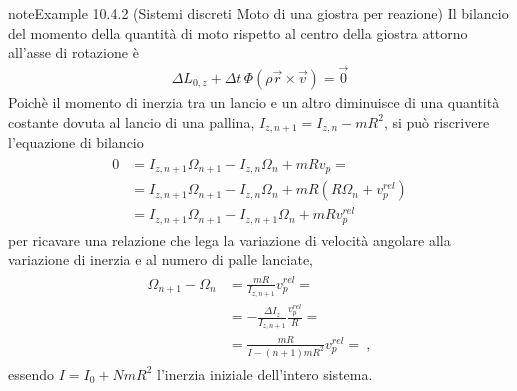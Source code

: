 \documentclass[letterpaper,10pt,italian]{jupyterBook}
\begin{document}
\begin{sphinxadmonition}{note}{Example 10.4.2 (Sistemi discreti \sphinxhyphen{} Moto di una giostra per reazione)}
\sphinxAtStartPar
Il bilancio del momento della quantità di moto rispetto al centro della giostra attorno all’asse di rotazione è
\begin{equation*}
\begin{split}\Delta L_{0,z} + \Delta t \, \Phi(\rho \vec{r} \times \vec{v}) = \vec{0}\end{split}
\end{equation*}
\sphinxAtStartPar
Poichè il momento di inerzia tra un lancio e un altro diminuisce di una quantità costante dovuta al lancio di una pallina,  \(I_{z,n+1} = I_{z,n} - m R^2\), si può riscrivere l’equazione di bilancio
\begin{equation*}
\begin{split}\begin{aligned}
  0 & = I_{z,n+1} \Omega_{n+1} - I_{z,n} \Omega_n + m R v_p =  \\
    & = I_{z,n+1} \Omega_{n+1} - I_{z,n} \Omega_n + m R ( R \Omega_n + v_p^{rel} ) \\
    & = I_{z,n+1} \Omega_{n+1} - I_{z,n+1} \Omega_n + m R v_p^{rel}
\end{aligned}\end{split}
\end{equation*}
\sphinxAtStartPar
per ricavare una relazione che lega la variazione di velocità angolare alla variazione di inerzia e al numero di palle lanciate,
\begin{equation*}
\begin{split}\begin{aligned}
  \Omega_{n+1} - \Omega_n & =  \frac{m R}{I_{z,n+1}} v_p^{rel} = \\
                          & = - \frac{\Delta I_{z}}{I_{z,n+1}} \frac{v_p^{rel}}{R} = \\
                          & =  \frac{m R}{I - (n+1) mR^2} v_p^{rel} = \ ,
\end{aligned}\end{split}
\end{equation*}
\sphinxAtStartPar
essendo \(I = I_0 + N m R^2\) l’inerzia iniziale dell’intero sistema.
\end{sphinxadmonition}
\label{ch/mechanics/dynamics-eom-open:example-2}
\end{document}
